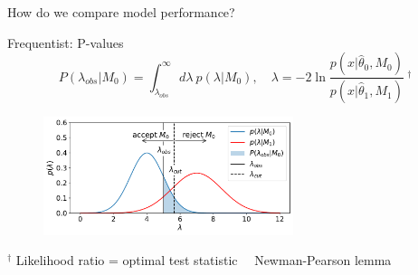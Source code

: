 \documentclass[
aspectratio=169,
14pt,
professionalfonts
]{beamer}
\newcommand{\arrow}{~\ding{220}~}
\begin{document}
\begin{frame}
    \center
    \Large
    How do we compare model performance?
\end{frame}

\begin{frame}{Frequentist: P-values}
    \vspace{-1cm}
    $$
    P(\lambda_{obs}|M_0) = \int_{\lambda_{obs}}^\infty d\lambda ~ p(\lambda|M_0), \quad  \lambda = -2 \ln \frac{p(x|\hat \theta_0, M_0)}{p(x|\hat \theta_1, M_1)} ~^\dagger
    $$
    \begin{figure}
        \centering
        \includegraphics[width=0.65\textwidth]{../plots/hypo.pdf}
    \end{figure}
    \small
    $^\dagger$ Likelihood ratio = optimal test statistic \arrow Newman-Pearson lemma
\end{frame}
\end{document}
